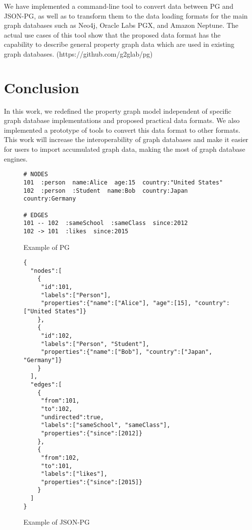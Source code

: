 \documentclass[runningheads]{llncs}
\begin{document}
We have implemented a command-line tool to convert data between PG and JSON-PG, as well as to transform them to the data loading formats for the main graph databases such as Neo4j, Oracle Labs PGX, and Amazon Neptune. The actual use cases of this tool show that the proposed data format has the capability to describe general property graph data which are used in existing graph databases. (https://github.com/g2glab/pg)

\section{Conclusion}
In this work, we redefined the property graph model independent of specific graph database implementations and proposed practical data formats. We also implemented a prototype of tools to convert this data format to other formats. 
This work will increase the interoperability of graph databases and make it easier for users to import accumulated graph data, making the most of graph database engines.

\begin{figure}[!t]
\begin{scriptsize}
\begin{verbatim}
# NODES
101  :person  name:Alice  age:15  country:"United States"
102  :person  :Student  name:Bob  country:Japan  country:Germany

# EDGES
101 -- 102  :sameSchool  :sameClass  since:2012
102 -> 101  :likes  since:2015
\end{verbatim}
\end{scriptsize}
\caption{Example of PG}
\label{fig:example-pg}
\end{figure}

\begin{figure}[!t]
\begin{scriptsize}
\begin{verbatim}
{
  "nodes":[
    {
     "id":101,
     "labels":["Person"],
     "properties":{"name":["Alice"], "age":[15], "country":["United States"]}
    },
    {
     "id":102,
     "labels":["Person", "Student"],
     "properties":{"name":["Bob"], "country":["Japan", "Germany"]}
    }
  ],
  "edges":[
    {
     "from":101,
     "to":102,
     "undirected":true,
     "labels":["sameSchool", "sameClass"],
     "properties":{"since":[2012]}
    },
    {
     "from":102,
     "to":101,
     "labels":["likes"],
     "properties":{"since":[2015]}
    }
  ]
}
\end{verbatim}
\end{scriptsize}
\caption{Example of JSON-PG}
\label{fig:example-json}
\end{figure}
\end{document}
